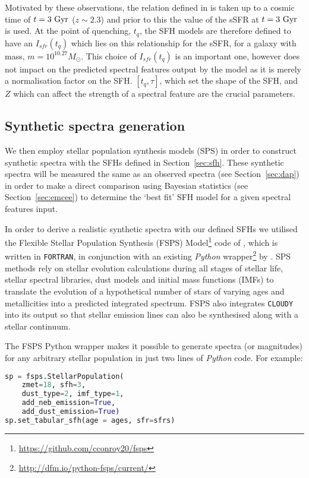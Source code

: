 \documentclass[useAMS,usenatbib]{mn2e}
\begin{document}
Motivated by these observations, the relation defined in \citet{peng10} is taken up to a cosmic time of $t=3~\rm{Gyr}$ ($z \sim 2.3$) and prior to this the value of the sSFR at $t=3~\rm{Gyr}$ is used. At the point of quenching, $t_{q}$, the SFH models are therefore defined to have an $I_{sfr}(t_q)$ which lies on this relationship for the sSFR, for a galaxy with mass, $m = 10^{10.27} M_{\odot}$. This choice of $I_{sfr}(t_q)$ is an important one, however does not impact on the predicted spectral features output by the model as it is merely a normalisation factor on the SFH. $[t_q, \tau]$, which set the shape of the SFH, and $Z$ which can affect the strength of a spectral feature are the crucial parameters.

\subsection{Synthetic spectra generation}\label{sec:fsps}

We then employ stellar population synthesis models (SPS) in order to construct synthetic spectra with the SFHs defined in Section~\ref{sec:sfh}. These synthetic spectra will be measured the same as an observed spectra (see Section~\ref{sec:dap}) in order to make a direct comparison using Bayesian statistics (see Section~\ref{sec:emcee}) to determine the `best fit' SFH model for a given spectral features input. 

In order to derive a realistic synthetic spectra with our defined SFHs we utilised the Flexible Stellar Population Synthesis (FSPS) Model\footnote{\url{https://github.com/cconroy20/fsps}} code of \cite{conroy09, conroy10}, which is written in \texttt{FORTRAN}, in conjunction with an existing \emph{Python} wrapper\footnote{\url{http://dfm.io/python-fsps/current/}} by \cite{python_fsps}. SPS methods rely on stellar evolution calculations during all stages of stellar life, stellar spectral libraries, dust models and initial mass functions (IMFs) to translate the evolution of a hypothetical number of stars of varying ages and metallicities into a predicted integrated spectrum. FSPS also integrates \texttt{CLOUDY} \citep{ferland13} into its output so that stellar emission lines can also be synthesised along with a stellar continuum. 

The FSPS Python wrapper makes it possible to generate spectra (or magnitudes) for any arbitrary stellar population in just two lines of \emph{Python} code. For example:

\begin{lstlisting}[language=Python]
sp = fsps.StellarPopulation(
	zmet=18, sfh=3, 
	dust_type=2, imf_type=1,
	add_neb_emission=True,  
	add_dust_emission=True)
sp.set_tabular_sfh(age = ages, sfr=sfrs)
\end{lstlisting}
\end{document}
